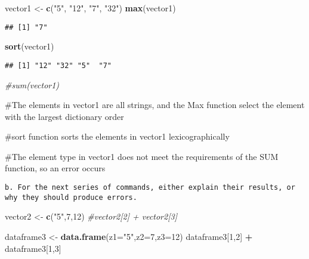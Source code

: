 \documentclass[
]{article}
\newenvironment{Shaded}{\begin{snugshade}}{\end{snugshade}}
\newcommand{\CommentTok}[1]{\textcolor[rgb]{0.56,0.35,0.01}{\textit{#1}}}
\newcommand{\DataTypeTok}[1]{\textcolor[rgb]{0.13,0.29,0.53}{#1}}
\newcommand{\DecValTok}[1]{\textcolor[rgb]{0.00,0.00,0.81}{#1}}
\newcommand{\KeywordTok}[1]{\textcolor[rgb]{0.13,0.29,0.53}{\textbf{#1}}}
\newcommand{\NormalTok}[1]{#1}
\newcommand{\OperatorTok}[1]{\textcolor[rgb]{0.81,0.36,0.00}{\textbf{#1}}}
\newcommand{\StringTok}[1]{\textcolor[rgb]{0.31,0.60,0.02}{#1}}
\begin{document}
\begin{Shaded}
\begin{Highlighting}[]
\NormalTok{vector1 <-}\StringTok{ }\KeywordTok{c}\NormalTok{(}\StringTok{"5"}\NormalTok{, }\StringTok{"12"}\NormalTok{, }\StringTok{"7"}\NormalTok{, }\StringTok{"32"}\NormalTok{)}
\KeywordTok{max}\NormalTok{(vector1)}
\end{Highlighting}
\end{Shaded}

\begin{verbatim}
## [1] "7"
\end{verbatim}

\begin{Shaded}
\begin{Highlighting}[]
\KeywordTok{sort}\NormalTok{(vector1)}
\end{Highlighting}
\end{Shaded}

\begin{verbatim}
## [1] "12" "32" "5"  "7"
\end{verbatim}

\begin{Shaded}
\begin{Highlighting}[]
\CommentTok{#sum(vector1)}
\end{Highlighting}
\end{Shaded}

\#The elements in vector1 are all strings, and the Max function select
the element with the largest dictionary order

\#sort function sorts the elements in vector1 lexicographically

\#The element type in vector1 does not meet the requirements of the SUM
function, so an error occurs

\begin{verbatim}
b. For the next series of commands, either explain their results, or why they should produce errors.
\end{verbatim}

\begin{Shaded}
\begin{Highlighting}[]
\NormalTok{vector2 <-}\StringTok{ }\KeywordTok{c}\NormalTok{(}\StringTok{"5"}\NormalTok{,}\DecValTok{7}\NormalTok{,}\DecValTok{12}\NormalTok{)}
\CommentTok{#vector2[2] + vector2[3]}

\NormalTok{dataframe3 <-}\StringTok{ }\KeywordTok{data.frame}\NormalTok{(}\DataTypeTok{z1=}\StringTok{"5"}\NormalTok{,}\DataTypeTok{z2=}\DecValTok{7}\NormalTok{,}\DataTypeTok{z3=}\DecValTok{12}\NormalTok{)}
\NormalTok{dataframe3[}\DecValTok{1}\NormalTok{,}\DecValTok{2}\NormalTok{] }\OperatorTok{+}\StringTok{ }\NormalTok{dataframe3[}\DecValTok{1}\NormalTok{,}\DecValTok{3}\NormalTok{]}
\end{Highlighting}
\end{Shaded}
\end{document}
